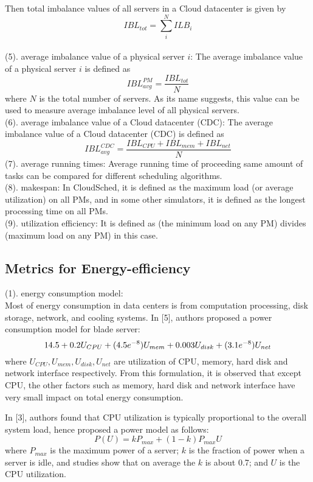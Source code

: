 \documentclass[3p, twocolumn]{elsarticle}
\begin{document}
Then total imbalance values of all servers in a Cloud datacenter is given by
\begin{equation}
IBL_{tot}=\sum_{i}^{N}ILB_i
\end{equation}\\
(5). average imbalance value of a physical server $i$:
The average imbalance value of a physical server $i$ is defined as
\begin{equation}
IBL_{avg}^{PM}=\frac{IBL_{tot}}{N}
\end{equation}
where $N$ is the total number of servers. As its name suggests, this value can be used to measure average imbalance level of all physical servers.\\
(6). average imbalance value of a Cloud datacenter (CDC):
The average imbalance value of a Cloud datacenter (CDC) is defined as
\begin{equation}
IBL_{avg}^{CDC}=\frac{IBL_{CPU}+IBL_{mem}+IBL_{net}}{N}
\end{equation}
(7). average running times:
Average running time of proceeding same amount of tasks can be compared for different scheduling algorithms.\\
(8). makespan:
In CloudSched, it is defined as the maximum load (or average utilization) on all PMs, and in some other simulators, it is defined as the longest processing time on all PMs.\\
(9). utilization efficiency: It is defined as (the minimum load on any PM) divides (maximum load on any PM) in this case.\\
\subsection{Metrics for Energy-efficiency}
\noindent (1). energy consumption model:\\
Most of energy consumption in data centers is from computation processing, disk storage, network, and cooling systems. In [5], authors proposed a power consumption model for blade server:
\begin{equation}
\small
14.5+0.2U_{CPU}+(4.5e^{-8})U_{mem}+0.003U_{disk}+(3.1e^{-8})U_{net}
\end{equation}
where $U_{CPU}, U_{mem}, U_{disk}, U_{net}$ are utilization of CPU, memory, hard disk and network interface respectively. From this formulation, it is observed that except CPU, the other factors such as memory, hard disk and network interface have very small impact on total energy consumption.

In [3], authors found that CPU utilization is typically proportional to the overall system load, hence proposed a power model as follows:
\begin{equation}
P(U)=kP_{max}+(1-k)P_{max} U
\end{equation}
where $P_{max}$ is the maximum power of a server; $k$ is the fraction of power when a server is idle, and studies show that on average the $k$ is about 0.7; and $U$ is the CPU utilization.
\end{document}
